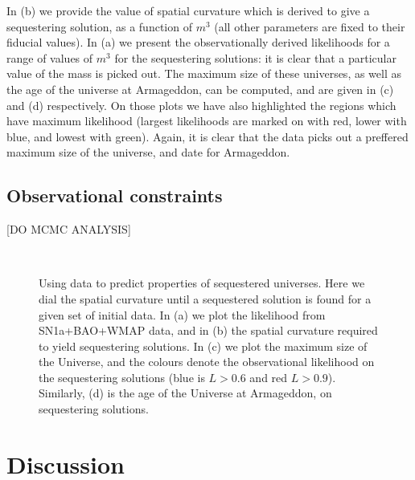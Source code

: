 \documentclass[amsmath,amssymb,10pt,twocolumn,eqsecnum]{revtex4}
\newcommand{\comment}[1]{{\color{red}[#1]}}
\begin{document}
In (b) we provide the value of spatial curvature which is derived to give a sequestering solution, as a function of $m^3$ (all other parameters are fixed to their fiducial values). In (a) we present the observationally derived likelihoods for a range of values of $m^3$ for the sequestering solutions: it is clear that a particular value of the mass is picked out. The maximum size of these universes, as well as the age of the universe at Armageddon, can be computed, and are given in (c) and (d) respectively. On those plots we have also highlighted the regions which have maximum likelihood (largest likelihoods are marked on with red, lower with blue, and lowest with green). Again, it is clear that the data picks out a preffered maximum size of the universe, and date for Armageddon.

\subsection{Observational constraints}
\comment{DO MCMC ANALYSIS}
 \begin{figure}[!t]
      \begin{center}
      	 \qquad
	\\
	 \qquad
      \end{center}
\caption{Using data to predict properties of sequestered universes. Here we dial the spatial curvature until a sequestered solution is found for a given set of initial data. In (a) we plot the likelihood from SN1a+BAO+WMAP data, and in (b) the spatial curvature required to yield sequestering solutions. In (c) we plot the maximum size of the Universe, and the colours denote the observational likelihood on the sequestering solutions (blue is $L > 0.6$ and red $L > 0.9$). Similarly, (d) is the age of the Universe at Armageddon, on sequestering solutions. }\label{likelihood_sequestering_sweep}
\end{figure}

\section{Discussion} 



\end{document}
